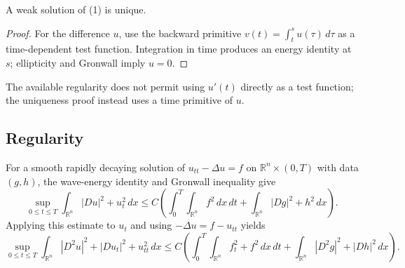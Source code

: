 \begin{theorem}
\label{thm:hyperbolic-uniqueness-weak-solution}

A weak solution of (1) is unique.
\end{theorem}

\begin{proof}
\sketch For the difference $u$, use the backward primitive $v(t)=\int_t^s u(\tau)\,d\tau$ as a time-dependent test function. Integration in time produces an energy identity at $s$; ellipticity and Gronwall imply $u=0$.
\end{proof}

\begin{remark}
\label{rem:hyperbolic-uniqueness-remark}

The available regularity does not permit using $u'(t)$ directly as a test function; the uniqueness proof instead uses a time primitive of $u$.
\end{remark}

\subsection{Regularity}

\begin{remark}
\label{rem:hyperbolic-regularity-motivation}

For a smooth rapidly decaying solution of $u_{tt}-\Delta u=f$ on $\mathbb R^n\times(0,T)$ with data $(g,h)$, the wave-energy identity and Gronwall inequality give
\[
\sup_{0\le t\le T}\int_{\mathbb R^n}|Du|^2+u_t^2\,dx
\le C\left(\int_0^T\int_{\mathbb R^n}f^2\,dx\,dt+\int_{\mathbb R^n}|Dg|^2+h^2\,dx\right).
\tag{42}
\]
Applying this estimate to $u_t$ and using $-\Delta u=f-u_{tt}$ yields
\[
\sup_{0\le t\le T}\int_{\mathbb R^n}|D^2u|^2+|Du_t|^2+u_{tt}^2\,dx
\le C\left(\int_0^T\int_{\mathbb R^n}f_t^2+f^2\,dx\,dt+\int_{\mathbb R^n}|D^2g|^2+|Dh|^2\,dx\right).
\tag{47}
\]
\end{remark}

